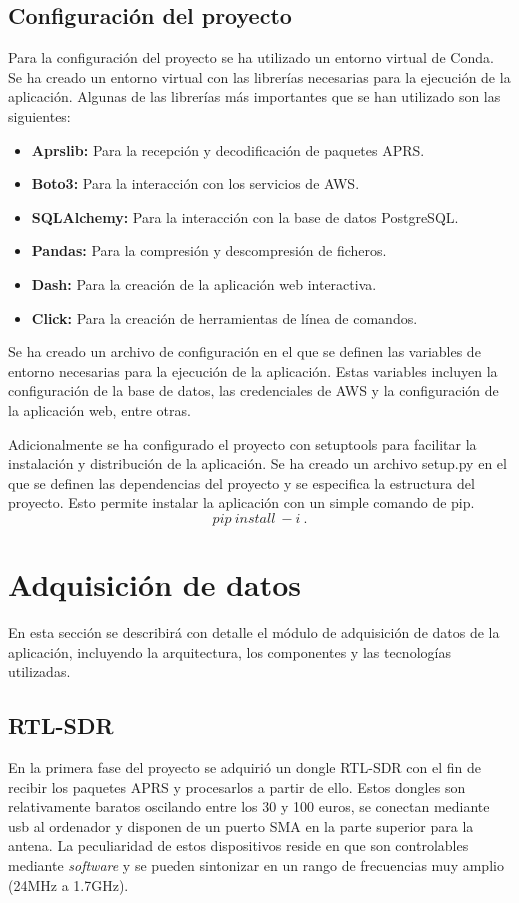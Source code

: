 \subsection{Configuración del proyecto}

Para la configuración del proyecto se ha utilizado un entorno virtual de Conda. Se ha creado un entorno virtual con las librerías necesarias para la ejecución de la aplicación. Algunas de las librerías más importantes que se han utilizado son las siguientes:

\begin{itemize}
	\item \textbf{Aprslib:} Para la recepción y decodificación de paquetes APRS.
	\item \textbf{Boto3:} Para la interacción con los servicios de AWS.
	\item \textbf{SQLAlchemy:} Para la interacción con la base de datos PostgreSQL.
	\item \textbf{Pandas:} Para la compresión y descompresión de ficheros.
	\item \textbf{Dash:} Para la creación de la aplicación web interactiva.
	\item \textbf{Click:} Para la creación de herramientas de línea de comandos.
\end{itemize}

Se ha creado un archivo de configuración en el que se definen las variables de entorno necesarias para la ejecución de la aplicación. Estas variables incluyen la configuración de la base de datos, las credenciales de AWS y la configuración de la aplicación web, entre otras.

Adicionalmente se ha configurado el proyecto con setuptools para facilitar la instalación y distribución de la aplicación. Se ha creado un archivo setup.py en el que se definen las dependencias del proyecto y se especifica la estructura del proyecto. Esto permite instalar la aplicación con un simple comando de pip.
$$pip\ install\ -i\ .$$

\section{Adquisición de datos}
En esta sección se describirá con detalle el módulo de adquisición de datos de la aplicación, incluyendo la arquitectura, los componentes y las tecnologías utilizadas.

\subsection{RTL-SDR}
En la primera fase del proyecto se adquirió un dongle RTL-SDR con el fin de recibir los paquetes APRS y procesarlos a partir de ello. Estos dongles son relativamente baratos oscilando entre los 30 y 100 euros, se conectan mediante usb al ordenador y disponen de un puerto SMA en la parte superior para la antena. La peculiaridad de estos dispositivos reside en que son controlables mediante \textit{software} y se pueden sintonizar en un rango de frecuencias muy amplio (24MHz a 1.7GHz).

